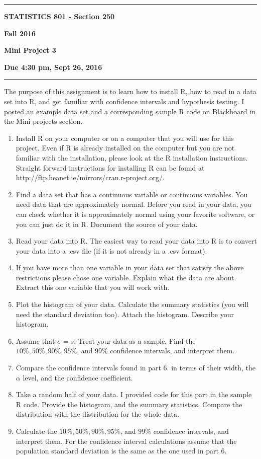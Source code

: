 \documentclass[12pt]{article}
\begin{document}
\hrule
\medskip
\centerline{\textbf{STATISTICS 801 - Section 250}}\hfill \textbf{Fall 2016}
\centerline{\textbf{Mini Project 3}}
\centerline{\textbf{Due 4:30 pm, Sept 26, 2016}}
\smallskip
\hrule

The purpose of this assignment is to learn how to install R, how to read in a data set into R, and get familiar with confidence intervals and hypothesis testing. I posted an example data set and a corresponding sample R code on Blackboard in the Mini projects section.
\begin{enumerate}
\item Install R on your computer or on a computer that you will use for this project. Even if R is already installed on the computer but you are not familiar with the installation, please look at the R installation instructions. Straight forward instructions for installing R can be found at http://ftp.heanet.ie/mirrors/cran.r-project.org/. 
\item Find a data set that has a continuous variable or continuous variables. You need data that are approximately normal. Before you read in your data, you can check whether it is approximately normal using your favorite software, or you can just do it in R. Document the source of your data.
\item Read your data into R. The easiest way to read your data into R is to convert your data into a .csv file (if it is not already in a .csv format). 
\item If you have more than one variable in your data set that satisfy the above restrictions please chose one variable. Explain what the data are about. Extract this one variable that you will work with. 
\item Plot the histogram of your data. Calculate the summary statistics (you will need the standard deviation too). Attach the histogram. Describe your histogram.
\item Assume that $\sigma=s$. Treat your data as a sample. Find the $10\%  , 50\%, 90\%, 95\%$, and $99\%$ confidence intervals, and interpret them.
\item Compare the confidence intervals found in part 6. in terms of their width, the $\alpha$ level, and the confidence coefficient.
\item Take a random half of your data. I provided code for this part in the sample R code.
Provide the histogram, and the summary statistics. Compare the distribution with the distribution for the whole data.
\item Calculate the  $10\%  , 50\%, 90\%, 95\%$, and $99\%$ confidence intervals, and interpret them. For the confidence interval calculations assume that the population standard deviation is the same as the one used in part 6.

\end{enumerate}
\end{document}
